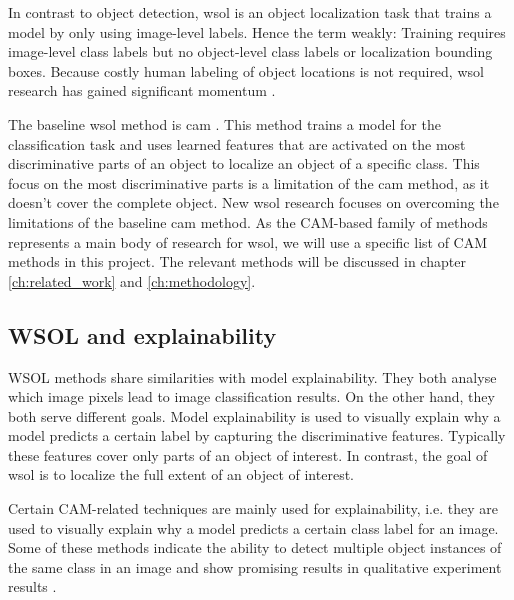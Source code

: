 In contrast to object detection, \acrshort{wsol} is an object localization task that trains a model by only using image-level labels. Hence the term weakly: Training requires image-level class labels but no object-level class labels or localization bounding boxes. Because costly human labeling of object locations is not required, \acrshort{wsol} research has gained significant momentum \cite{zhou2016cvpr, selvaraju2017grad, chattopadhay2018grad, wang2021minmaxcam, wang2020score, choe2020evaluating}.

The baseline \acrshort{wsol} method is \acrfull{cam} \cite{zhou2016cvpr}. This method trains a model for the classification task and uses learned features that are activated on the most discriminative parts of an object to localize an object of a specific class. This focus on the most discriminative parts is a limitation of the \acrshort{cam} method, as it doesn't cover the complete object. New \acrshort{wsol} research \cite{selvaraju2017grad, chattopadhay2018grad, wang2021minmaxcam, wang2020score, choe2020evaluating} focuses on overcoming the limitations of the baseline \acrshort{cam} method. As the CAM-based family of methods represents a main body of research for \acrlong{wsol}, we will use a specific list of CAM methods in this project. The relevant methods will be discussed in chapter \ref{ch:related_work} and \ref{ch:methodology}. 

\subsection{WSOL and explainability}
WSOL methods share similarities with model explainability. They both analyse which image pixels lead to image classification results. On the other hand, they both serve different goals.
Model explainability is used to visually explain why a model predicts a certain label by capturing the discriminative features. Typically these features cover only parts of an object of interest. In contrast, the goal of \acrshort{wsol} is to localize the full extent of an object of interest.

Certain CAM-related techniques are mainly used for explainability, i.e. they are used to visually explain why a model predicts a certain class label for an image. Some of these methods indicate the ability to detect multiple object instances of the same class in an image and show promising results in qualitative experiment results \cite{wang2020score}.

